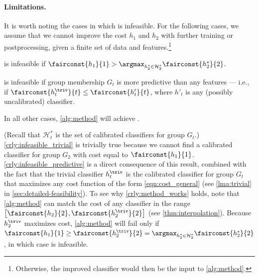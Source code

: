 \paragraph{Limitations.}
%
It is worth noting the cases in which \methodname{} is infeasible. For the following cases,
we assume that we cannot improve the cost $h_1$ and $h_2$ with further training
or postprocessing, given a finite set
of data and features.\footnote{
  Otherwise, the improved classifier would then be the input to \autoref{alg:method}.
}
%
\begin{corollary}
  \methodname{} is infeasible if
  $\fairconst{h_1}{1} > \argmax_{h^*_2 \in \mathcal{H}^*_2} \fairconst{h^*_2}{2}$.
  \label{crly:infeasible_trivial}
\end{corollary}
%
\begin{corollary}
  \methodname{} is infeasible if group membership $G_t$ is more predictive
  than any features --- i.e., if
  $ \fairconst{h^\triv_t}{t} \leq \fairconst{h'_t}{t}$, where $h'_t$ is
  any (possibly uncalibrated) classifier.
  \label{crly:infeasible_predictive}
\end{corollary}
%
\begin{corollary}
  In all other cases, \autoref{alg:method} will achieve \methodname{}.
  \label{crly:method_works}
\end{corollary}
%
(Recall that $\mathcal{H}^*_t$ is the set of calibrated classifiers for group $G_t$.)
\autoref{crly:infeasible_trivial} is trivially true because we cannot find a
calibrated classifier for group $G_2$ with cost equal to $\fairconst{h_1}{1}$.
\autoref{crly:infeasible_predictive} is a direct consequence of this result, combined with the fact that
the trivial classifier $h^\triv_t$ is the calibrated classifier for group $G_t$ that
maximizes any cost function of the form \eqref{eqn:cost_general}
(see \autoref{lma:trivial} in \autoref{sec:detailed-feasibility}).
To see why \autoref{crly:method_works} holds, note that \autoref{alg:method}
can match the cost of any classifier in the range $\left[ \fairconst{h_2}{2}, \fairconst{h^\triv_2}{2} \right]$
(see \autoref{thm:interpolation}).
Because $h^\triv_2$ maximizes cost, \autoref{alg:method} will fail only if
$\fairconst{h_1}{1} \geq \fairconst{h^\triv_2}{2} = \argmax_{h^*_2 \in
\mathcal{H}^*_2} \fairconst{h^*_2}{2}$, in which case \methodname{} is
infeasible.


